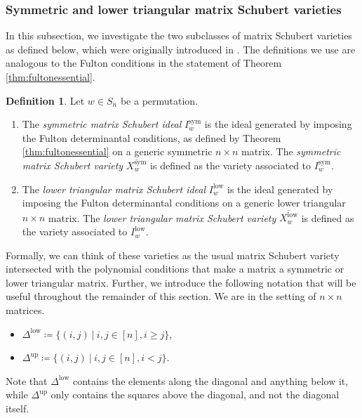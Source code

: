 \documentclass[11pt]{amsart}
\theoremstyle{definition}
\theoremstyle{definition}
\newtheorem{definition}[theorem]{Definition}
\theoremstyle{definition}
\theoremstyle{definition}
\begin{document}
\subsubsection{Symmetric and lower triangular matrix Schubert varieties}
\noindent In this subsection, we investigate the two subclasses of matrix Schubert varieties as defined below, which were originally introduced in \cite{fink2016matrix}. The definitions we use are analogous to the Fulton conditions in the statement of Theorem \ref{thm:fultonessential}. 

\begin{definition}
    Let $w \in S_n$ be a permutation. 
    \begin{enumerate}
        \item The \emph{symmetric matrix Schubert ideal} $I^{\text{sym}}_w$ is the ideal generated by imposing the Fulton determinantal conditions, as defined by Theorem \ref{thm:fultonessential} on a generic symmetric $n\times n$ matrix. The \emph{symmetric matrix Schubert variety} $\overline{X^{\text{sym}}_w}$ is defined as the variety associated to $I^{\text{sym}}_w$.
         \item The \emph{lower triangular matrix Schubert ideal} $I^{\text{low}}_w$ is the ideal generated by imposing the Fulton determinantal conditions on a generic lower triangular $n\times n$ matrix. The \emph{lower triangular matrix Schubert variety} $\overline{X^{\text{low}}_w}$ is defined as the variety associated to $I^{\text{low}}_w$.
    \end{enumerate}
\end{definition}

\noindent Formally, we can think of these varieties as the usual matrix Schubert variety intersected with the polynomial conditions that make a matrix a symmetric or lower triangular matrix.
Further, we introduce the following notation that will be useful throughout the remainder of this section. We are in the setting of $n\times n$ matrices.
\begin{itemize}
    \item $\Delta^{\textrm{low}} \coloneqq \{ (i,j) \ | \ i,j\in[n], i\geq j \}$,
    \item $\Delta^{\textrm{up}} \coloneqq \{ (i,j) \ | \ i,j\in[n], i< j \}$.
\end{itemize}
\noindent Note that $\Delta^{\textrm{low}}$ contains the elements along the diagonal and anything below it, while $\Delta^{\textrm{up}}$ only contains the squares above the diagonal, and not the diagonal itself.
\end{document}
